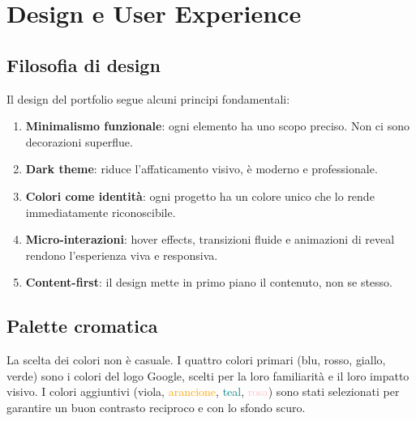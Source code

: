 \documentclass[a4paper,12pt]{report}
\begin{document}
\chapter{Design e User Experience}

\section{Filosofia di design}

Il design del portfolio segue alcuni principi fondamentali:

\begin{enumerate}[leftmargin=2cm]
    \item \textbf{Minimalismo funzionale}: ogni elemento ha uno scopo preciso. Non ci sono decorazioni superflue.
    \item \textbf{Dark theme}: riduce l'affaticamento visivo, \`e moderno e professionale.
    \item \textbf{Colori come identit\`a}: ogni progetto ha un colore unico che lo rende immediatamente riconoscibile.
    \item \textbf{Micro-interazioni}: hover effects, transizioni fluide e animazioni di reveal rendono l'esperienza viva e responsiva.
    \item \textbf{Content-first}: il design mette in primo piano il contenuto, non se stesso.
\end{enumerate}

\section{Palette cromatica}

La scelta dei colori non \`e casuale. I quattro colori primari (\textcolor{googleblue}{blu}, \textcolor{googlered}{rosso}, \textcolor{googleyellow}{giallo}, \textcolor{googlegreen}{verde}) sono i colori del logo Google, scelti per la loro familiarit\`a e il loro impatto visivo. I colori aggiuntivi (\textcolor{googlepurple}{viola}, \textcolor{orange}{arancione}, \textcolor{teal}{teal}, \textcolor{pink}{rosa}) sono stati selezionati per garantire un buon contrasto reciproco e con lo sfondo scuro.
\end{document}
